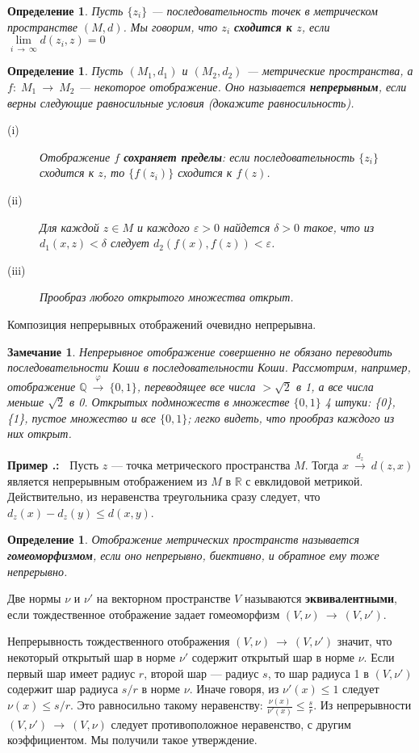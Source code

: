 \documentclass[12pt]{book}
\newcommand{\arrow}{{\:\longrightarrow\:}}
\renewcommand{\phi}{\varphi}
\renewcommand{\epsilon}{\varepsilon}
\def\R{{\mathbb R}}
\def\Q{{\mathbb Q}}
\theoremstyle{upshape}
\newtheorem{zadacha}{Задача}[chapter]
\theoremstyle{generic}
\newtheorem{opredelenie}[teorema]{Определение}
\newtheorem{remark}[teorema]{Замечание}
\def\замечание{\begin{remark}}
\def\еза{\end{remark}}
\theoremstyle{upshapenonumber}
\newcommand{\следствие}{%
     \refstepcounter{teorema}
     {\noindent\bf Следствие \thechapter.\arabic{teorema}:\ }}
\newcommand{\пример}{%
     \refstepcounter{teorema}
     {\noindent\bf Пример \thechapter.\arabic{teorema}:\ }}
\newcommand{\лемма}{%
     \refstepcounter{teorema}
     {\noindent\bf Лемма \thechapter.\arabic{teorema}:\ }}
\newcommand{\теорема}{%
     \refstepcounter{teorema}
     {\noindent\bf Теорема \thechapter.\arabic{teorema}:\ }}
\newcommand{\утверждение}{%
     \refstepcounter{teorema}
     {\noindent\bf Утверждение \thechapter.\arabic{teorema}:\ }}
\def\бф{\bf}
\def\ем{\em}
\def\задача{\begin{zadacha}}
\def\ез{\end{zadacha}}
\def\еу{\end{ukazanie}}
\def\определение{\begin{opredelenie}}
\def\ео{\end{opredelenie}}
\def\енум{\begin{enumerate}}
\def\ее{\end{enumerate}}
\begin{document}
\определение
Пусть $\{z_i\}$ --- последовательность точек в метрическом
пространстве $(M,d)$. Мы говорим, что $z_i$ {\бф сходится к $z$},
если $\lim\limits_{i\arrow \infty} d(z_i, z) =0$
\ео

\определение
Пусть $(M_1, d_1)$ и $(M_2, d_2)$ --- метрические пространства,
а $f:\; M_1 \arrow M_2$ --- некоторое отображение.
Оно называется {\бф непрерывным}, если верны
следующие равносильные условия (докажите равносильность).
\begin{description}
\item[(i)] Отображение $f$ {\бф сохраняет пределы}: 
если последовательность $\{z_i\}$ сходится
к $z$, то $\{f(z_i)\}$ сходится к $f(z)$.
\item[(ii)] Для каждой $z\in M$ и каждого $\epsilon >0$ найдется
$\delta >0$ такое, что из $d_1(x, z) < \delta$ следует
$d_2(f(x), f(z)) <\epsilon$.
\item[(iii)] Прообраз любого открытого множества открыт.
\end{description}
\ео

Композиция непрерывных отображений очевидно непрерывна.

\замечание 
Непрерывное отображение совершенно не обязано переводить
последовательности Коши в последовательности
Коши. Рассмотрим, например, отображение 
$\Q \stackrel \phi\arrow \{0, 1\}$,
переводящее все числа $> \sqrt 2$ в 1,
 а все числа меньше $\sqrt 2$ в 0.
Открытых подмножеств в множестве 
$\{0, 1\}$ 4 штуки: \{0\}, \{1\}, пустое
множество и все $\{0, 1\}$; легко видеть,
что прообраз каждого из них открыт.

\еза

\пример\label{_distance_cont_Primer_}
Пусть $z$ --- точка метрического пространства $M$.
Тогда $x \stackrel {d_z} \arrow d(z,x)$ является непрерывным отображением
из $M$ в $\R$ с евклидовой метрикой. Действительно,
из неравенства треугольника сразу следует, что
$d_z(x)-d_z(y) \leq d(x,y)$.

\определение
Отображение метрических пространств называется
{\бф гомеоморфизмом}, если оно непрерывно, биективно,
и обратное ему тоже непрерывно.
\ео

Две нормы $\nu$ и $\nu'$ на векторном пространстве $V$
называются {\бф эквивалентными}, если тождественное
отображение задает гомеоморфизм $(V, \nu) \arrow (V,\nu')$.

Непрерывность тождественного отображения $(V, \nu)\arrow (V,\nu')$
значит, что некоторый открытый шар в норме $\nu'$
содержит открытый шар в норме $\nu$. Если первый шар
имеет радиус $r$, второй шар --- радиус $s$, то шар
радиуса 1 в $(V, \nu')$ содержит шар радиуса $s/r$
в норме $\nu$. Иначе говоря, из $\nu'(x) \leq 1$
следует $\nu(x)\leq s/r$. Это равносильно такому
неравенству: $\frac {\nu(x)}{\nu'(x)}\leq \frac s r$.
Из непрерывности $(V, \nu')\arrow (V,\nu)$
следует противоположное неравенство, с другим
коэффициентом. Мы получили такое утверждение. 
\end{document}

